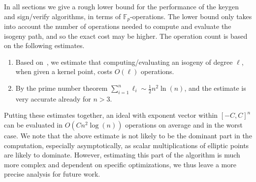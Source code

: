 \documentclass{llncs}
\newcommand{\F}{\mathbb{F}}
\begin{document}
In all sections we give a rough lower bound for the performance of the keygen and sign/verify algorithms, in terms of $\F_p$-operations.
The lower bound only takes into account the number of operations needed to compute and evaluate the isogeny path, and so the exact cost may be higher.
The operation count is based on the following estimates.
\begin{enumerate}
\item Based
  on~\cite{10.1007/978-3-319-70697-9_11,10.1007/978-3-319-79063-3_11},
  we estimate that computing/evaluating an isogeny of degree $\ell$, when given a kernel point,
  costs $O(\ell)$ operations.
\item By the prime number theorem $\sum_{i=1}^n\ell_i\sim\frac{1}{2}n^2\ln(n)$, and the estimate is very accurate already for $n>3$.
\end{enumerate}
Putting these estimates together, an ideal with exponent vector within $[-C,C]^n$ can be evaluated in $O(Cn^2\log(n))$ operations on average and in the worst case. We note that the above estimate is not likely to be the dominant part in the computation, especially asymptotically,
as scalar multiplications of elliptic points are likely to dominate.
However, estimating this part of the algorithm is much more complex and dependent on specific optimizations, we thus leave a more precise analysis for future work.
\end{document}
